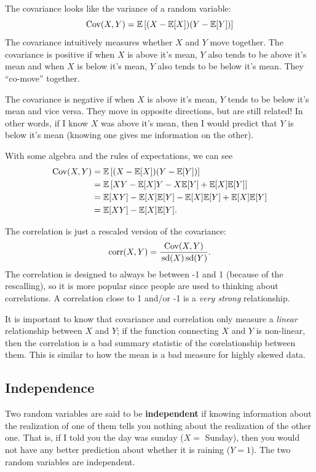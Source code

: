 \documentclass[12pt]{article}
\begin{document}
The covariance looks like the variance of a random variable:
$$
  \cov(X, Y) = \mathbb{E}\left[ (X - \expec{X}) (Y - \expec{Y}) \right]
$$
The covariance intuitively measures whether $X$ and $Y$ move together. The covariance is positive if when $X$ is above it's mean, $Y$ also tends to be above it's mean and when $X$ is below it's mean, $Y$ also tends to be below it's mean. They ``co-move'' together.

The covariance is negative if when $X$ is above it's mean, $Y$ tends to be below it's mean and vice versa. They move in opposite directions, but are still related! In other words, if I know $X$ was above it's mean, then I would predict that $Y$ is below it's mean (knowing one gives me information on the other).

With some algebra and the rules of expectations, we can see
\begin{align*}
  \cov(X, Y)
  &= \mathbb{E}\left[ (X - \expec{X}) (Y - \expec{Y}) \right] \\
  &= \mathbb{E}\left[ XY - \expec{X} Y - X \expec{Y} + \expec{X} \expec{Y} \right] \\
  &= \expec{XY} - \expec{X} \expec{Y} - \expec{X} \expec{Y} + \expec{X} \expec{Y} \\
  &= \expec{XY} - \expec{X} \expec{Y}.
\end{align*}


The correlation is just a rescaled version of the covariance:
$$
  \corr(X, Y) = \frac{\cov(X, Y)}{\sd{X} \sd{Y}}.
$$
The correlation is designed to always be between -1 and 1 (because of the rescalling), so it is more popular since people are used to thinking about correlations. A correlation close to 1 and/or -1 is a \emph{very strong} relationship.

It is important to know that covariance and correlation only measure a \emph{linear} relationship between $X$ and $Y$; if the function connecting $X$ and $Y$ is non-linear, then the correlation is a bad summary statistic of the corelationship between them. This is similar to how the mean is a bad measure for highly skewed data.

\subsection*{Independence}

Two random variables are said to be \textbf{independent} if knowing information about the realization of one of them tells you nothing about the realization of the other one. That is, if I told you the day was sunday ($X = $ Sunday), then you would not have any better prediction about whether it is raining ($Y = 1$). The two random variables are independent.
\end{document}
